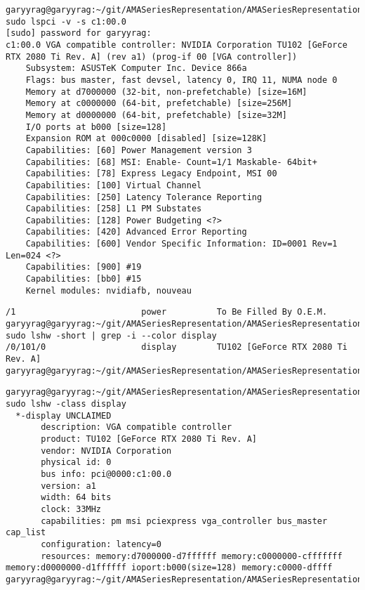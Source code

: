 \documentclass[hyperref]{labbook}
\begin{document}
\begin{verbatim}
garyyrag@garyyrag:~/git/AMASeriesRepresentation/AMASeriesRepresentation$ sudo lspci -v -s c1:00.0
[sudo] password for garyyrag: 
c1:00.0 VGA compatible controller: NVIDIA Corporation TU102 [GeForce RTX 2080 Ti Rev. A] (rev a1) (prog-if 00 [VGA controller])
	Subsystem: ASUSTeK Computer Inc. Device 866a
	Flags: bus master, fast devsel, latency 0, IRQ 11, NUMA node 0
	Memory at d7000000 (32-bit, non-prefetchable) [size=16M]
	Memory at c0000000 (64-bit, prefetchable) [size=256M]
	Memory at d0000000 (64-bit, prefetchable) [size=32M]
	I/O ports at b000 [size=128]
	Expansion ROM at 000c0000 [disabled] [size=128K]
	Capabilities: [60] Power Management version 3
	Capabilities: [68] MSI: Enable- Count=1/1 Maskable- 64bit+
	Capabilities: [78] Express Legacy Endpoint, MSI 00
	Capabilities: [100] Virtual Channel
	Capabilities: [250] Latency Tolerance Reporting
	Capabilities: [258] L1 PM Substates
	Capabilities: [128] Power Budgeting <?>
	Capabilities: [420] Advanced Error Reporting
	Capabilities: [600] Vendor Specific Information: ID=0001 Rev=1 Len=024 <?>
	Capabilities: [900] #19
	Capabilities: [bb0] #15
	Kernel modules: nvidiafb, nouveau

\end{verbatim}

\begin{verbatim}
/1                         power          To Be Filled By O.E.M.
garyyrag@garyyrag:~/git/AMASeriesRepresentation/AMASeriesRepresentation$ sudo lshw -short | grep -i --color display
/0/101/0                   display        TU102 [GeForce RTX 2080 Ti Rev. A]
garyyrag@garyyrag:~/git/AMASeriesRepresentation/AMASeriesRepresentation$ 
\end{verbatim}


\begin{verbatim}
garyyrag@garyyrag:~/git/AMASeriesRepresentation/AMASeriesRepresentation$ sudo lshw -class display
  *-display UNCLAIMED
       description: VGA compatible controller
       product: TU102 [GeForce RTX 2080 Ti Rev. A]
       vendor: NVIDIA Corporation
       physical id: 0
       bus info: pci@0000:c1:00.0
       version: a1
       width: 64 bits
       clock: 33MHz
       capabilities: pm msi pciexpress vga_controller bus_master cap_list
       configuration: latency=0
       resources: memory:d7000000-d7ffffff memory:c0000000-cfffffff memory:d0000000-d1ffffff ioport:b000(size=128) memory:c0000-dffff
garyyrag@garyyrag:~/git/AMASeriesRepresentation/AMASeriesRepresentation$ 
\end{verbatim}
\end{document}

